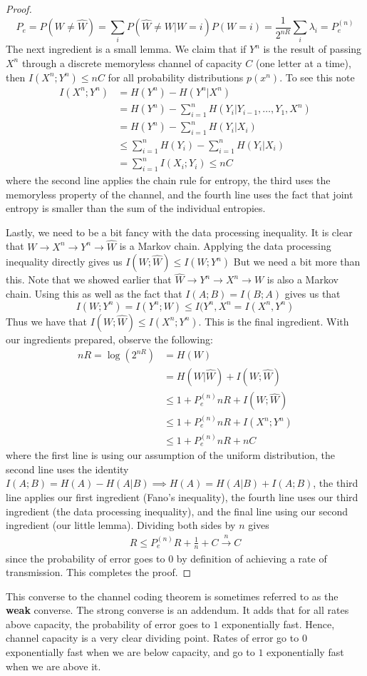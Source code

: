 \documentclass{article}
\theoremstyle{definition}
\theoremstyle{plain}
\begin{document}
\begin{proof}
 \[ P_e = P(W \neq \hat{W}) = \sum_i P(\hat{W} \neq W|W=i)P(W=i) = \frac{1}{2^{nR}}\sum_i \lambda_i = P_e^{(n)} \]
 The next ingredient is a small lemma. We claim that if $Y^n$ is the result of passing $X^n$ through a discrete memoryless channel of capacity $C$ (one letter at a time), then $I(X^n;Y^n) \leq nC$ for all probability distributions $p(x^n)$. To see this note
 \begin{align}
 	I(X^n;Y^n) &= H(Y^n)-H(Y^n|X^n) \\ &= H(Y^n)-\sum_{i=1}^n H(Y_i|Y_{i-1},\ldots,Y_1,X^n) \\ &= H(Y^n) - \sum_{i=1}^n H(Y_i|X_i) \\
 	&\leq \sum_{i=1}^n H(Y_i)-\sum_{i=1}^n H(Y_i|X_i) \\
 	&= \sum_{i=1}^n I(X_i;Y_i) \leq nC
 \end{align}
 where the second line applies the chain rule for entropy, the third uses the memoryless property of the channel, and the fourth line uses the fact that joint entropy is smaller than the sum of the individual entropies. \par 
 Lastly, we need to be a bit fancy with the data processing inequality. It is clear that $W \to X^n \to Y^n \to \hat{W}$ is a Markov chain. Applying the data processing inequality directly gives us $I(W;\hat{W})\leq I(W;Y^n)$ But we need a bit more than this. Note that we showed earlier that $\hat{W} \to Y^n \to X^n \to W$ is also a Markov chain. Using this as well as the fact that $I(A;B) = I(B;A)$ gives us that \[ I(W;Y^n) = I(Y^n;W) \leq I(Y^n,X^n = I(X^n,Y^n) \]
 Thus we have that $I(W;\hat{W}) \leq I(X^n;Y^n)$. This is the final ingredient. With our ingredients prepared, observe the following:
 \begin{align}
 	nR = \log(2^{nR}) &= H(W) \\
 			&= H(W|\hat{W})+I(W;\hat{W}) \\
 			&\leq 1+P_e^{(n)}nR+I(W;\hat{W}) \\
 			&\leq 1+P_e^{(n)}nR + I(X^n;Y^n) \\
 			&\leq 1+P_e^{(n)}nR + nC
 \end{align}
 where the first line is using our assumption of the uniform distribution, the second line uses the identity $I(A;B) = H(A)-H(A|B) \implies H(A) = H(A|B)+I(A;B)$, the third line applies our first ingredient (Fano's inequality), the fourth line uses our third ingredient (the data processing inequality), and the final line using our second ingredient (our little lemma). Dividing both sides by $n$ gives 
 \begin{align}
 	R \leq P_e^{(n)}R + \frac{1}{n} + C \overset{n}{\to} C
 \end{align}
 since the probability of error goes to $0$ by definition of achieving a rate of transmission. This completes the proof.
\end{proof}
This converse to the channel coding theorem is sometimes referred to as the \textbf{weak} converse. The strong converse is an addendum. It adds that for all rates above capacity, the probability of error goes to $1$ exponentially fast. Hence, channel capacity is a very clear dividing point. Rates of error go to $0$ exponentially fast when we are below capacity, and go to $1$ exponentially fast when we are above it. 
\end{document}
